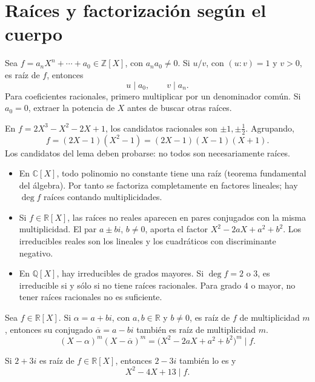 \section{Raíces y factorización según el cuerpo}
\begin{proposicion}[{title={Raíces racionales: lema de Gauss}}]
Sea $f=a_nX^n+\cdots+a_0\in\mathbb Z[X]$, con $a_na_0\neq0$.
Si $u/v$, con $(u:v)=1$ y $v>0$, es raíz de $f$, entonces
\[
u\mid a_0,\qquad v\mid a_n.
\]
Para coeficientes racionales, primero multiplicar por un denominador común.
Si $a_0=0$, extraer la potencia de $X$ antes de buscar otras raíces.
\end{proposicion}
\begin{ejemplo}
En $f=2X^3-X^2-2X+1$, los candidatos racionales son
$\pm1,\pm\tfrac12$. Agrupando,
\[
f=(2X-1)(X^2-1)=(2X-1)(X-1)(X+1).
\]
Los candidatos del lema deben probarse: no todos son necesariamente raíces.
\end{ejemplo}
\begin{proposicion}[{title={Factorización en $\mathbb C$, $\mathbb R$ y $\mathbb Q$}}]
\begin{itemize}
\item En $\mathbb C[X]$, todo polinomio no constante tiene una raíz
(teorema fundamental del álgebra). Por tanto se factoriza completamente
en factores lineales; hay $\deg f$ raíces contando multiplicidades.
\item Si $f\in\mathbb R[X]$, las raíces no reales aparecen en pares conjugados
con la misma multiplicidad. El par $a\pm bi$, $b\neq0$, aporta el factor
$X^2-2aX+a^2+b^2$. Los irreducibles reales son los lineales y los
cuadráticos con discriminante negativo.
\item En $\mathbb Q[X]$, hay irreducibles de grados mayores. Si $\deg f=2$ o $3$,
es irreducible si y sólo si no tiene raíces racionales.
Para grado $4$ o mayor, no tener raíces racionales no es suficiente.
\end{itemize}
\end{proposicion}
\begin{proposicion}[{title={Raíces complejas conjugadas en $\mathbb R[X]$}}]
Sea $f\in\mathbb R[X]$. Si $\alpha=a+bi$, con $a,b\in\mathbb R$ y $b\neq0$,
es raíz de $f$ de multiplicidad $m$, entonces su conjugado
$\overline\alpha=a-bi$ también es raíz de multiplicidad $m$.
\[
(X-\alpha)^m(X-\overline\alpha)^m
=\bigl(X^2-2aX+a^2+b^2\bigr)^m\mid f.
\]
\end{proposicion}
\begin{ejemplo}
Si $2+3i$ es raíz de $f\in\mathbb R[X]$, entonces $2-3i$ también lo es y
\[
X^2-4X+13\mid f.
\]
\end{ejemplo}
